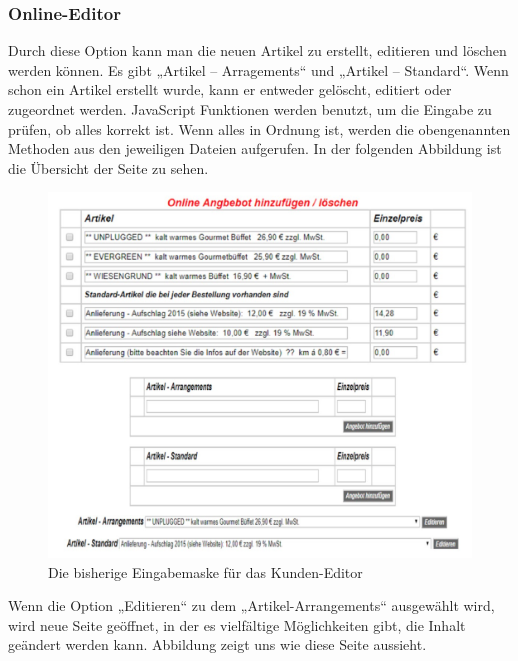 \subsubsection{Online-Editor}

Durch diese Option kann man die neuen Artikel zu erstellt, editieren und löschen werden können.  Es gibt „Artikel – Arragements“ und „Artikel – Standard“. Wenn schon ein Artikel erstellt wurde, kann er entweder gelöscht, editiert oder zugeordnet werden. 
JavaScript Funktionen werden benutzt, um die Eingabe zu prüfen, ob alles korrekt ist. Wenn alles in Ordnung ist, werden die obengenannten Methoden aus den jeweiligen Dateien aufgerufen. In der folgenden Abbildung ist die Übersicht der Seite zu sehen.
\pagebreak

\begin{figure}[h]
	\centering
	\includegraphics[width=0.7\linewidth]{Graphics/menue-uebesicht.png}
	\caption[Kundeansicht]{Die bisherige Eingabemaske für das Kunden-Editor}
	\label{fig: Online-Editor übersicht}
\end{figure}

Wenn die Option „Editieren“ zu dem „Artikel-Arrangements“ ausgewählt wird, wird neue Seite geöffnet, in der es vielfältige Möglichkeiten gibt, die Inhalt geändert werden kann. Abbildung   zeigt uns wie diese Seite aussieht.

